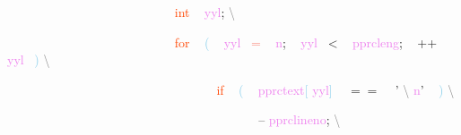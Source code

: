 \documentclass[8, usernames, dvipsnames]{beamer}
\begin{document}
\begin{frame}
\textcolor{White}{\ }
\textcolor{White}{\ }
\textcolor{White}{\ }
\textcolor{White}{\ }
\textcolor{White}{\ }
\textcolor{White}{\ }
\textcolor{White}{\ }
\textcolor{White}{\ }
\textcolor{White}{\ }
\textcolor{White}{\ }
\textcolor{White}{\ }
\textcolor{White}{\ }
\textcolor{White}{\ }
\textcolor{White}{\ }
\textcolor{White}{\ }
\textcolor{White}{\ }
\textcolor{OrangeRed}{int}
\textcolor{White}{\ }
\textcolor{Violet}{yyl}\textcolor{Sepia}{;}
\textcolor{Gray}{\textbackslash }

 \textcolor{White}{\ }
\textcolor{White}{\ }
\textcolor{White}{\ }
\textcolor{White}{\ }
\textcolor{White}{\ }
\textcolor{White}{\ }
\textcolor{White}{\ }
\textcolor{White}{\ }
\textcolor{White}{\ }
\textcolor{White}{\ }
\textcolor{White}{\ }
\textcolor{White}{\ }
\textcolor{White}{\ }
\textcolor{White}{\ }
\textcolor{White}{\ }
\textcolor{White}{\ }
\textcolor{OrangeRed}{for}
\textcolor{White}{\ }
\textcolor{SkyBlue}{(}
\textcolor{White}{\ }
\textcolor{Violet}{yyl}\textcolor{White}{\ }
\textcolor{Salmon}{=}
\textcolor{White}{\ }
\textcolor{Violet}{n}\textcolor{Sepia}{;}
\textcolor{White}{\ }
\textcolor{Violet}{yyl}\textcolor{White}{\ }
\textcolor{OliveGreen}{\textless}
\textcolor{White}{\ }
\textcolor{Violet}{pprcleng}\textcolor{Sepia}{;}
\textcolor{White}{\ }
\textcolor{Apricot}{++}
\textcolor{Violet}{yyl}\textcolor{White}{\ }
\textcolor{SkyBlue}{)}
\textcolor{Gray}{\textbackslash }

 \textcolor{White}{\ }
\textcolor{White}{\ }
\textcolor{White}{\ }
\textcolor{White}{\ }
\textcolor{White}{\ }
\textcolor{White}{\ }
\textcolor{White}{\ }
\textcolor{White}{\ }
\textcolor{White}{\ }
\textcolor{White}{\ }
\textcolor{White}{\ }
\textcolor{White}{\ }
\textcolor{White}{\ }
\textcolor{White}{\ }
\textcolor{White}{\ }
\textcolor{White}{\ }
\textcolor{White}{\ }
\textcolor{White}{\ }
\textcolor{White}{\ }
\textcolor{White}{\ }
\textcolor{OrangeRed}{if}
\textcolor{White}{\ }
\textcolor{SkyBlue}{(}
\textcolor{White}{\ }
\textcolor{Violet}{pprctext}\textcolor{SkyBlue}{[}
\textcolor{Violet}{yyl}\textcolor{SkyBlue}{]}
\textcolor{White}{\ }
\textcolor{OliveGreen}{$==$}
\textcolor{White}{\ }
\textcolor{BurntOrange}{'}
\textcolor{Gray}{\textbackslash }
\textcolor{Violet}{n}\textcolor{BurntOrange}{'}
\textcolor{White}{\ }
\textcolor{SkyBlue}{)}
\textcolor{Gray}{\textbackslash }

 \textcolor{White}{\ }
\textcolor{White}{\ }
\textcolor{White}{\ }
\textcolor{White}{\ }
\textcolor{White}{\ }
\textcolor{White}{\ }
\textcolor{White}{\ }
\textcolor{White}{\ }
\textcolor{White}{\ }
\textcolor{White}{\ }
\textcolor{White}{\ }
\textcolor{White}{\ }
\textcolor{White}{\ }
\textcolor{White}{\ }
\textcolor{White}{\ }
\textcolor{White}{\ }
\textcolor{White}{\ }
\textcolor{White}{\ }
\textcolor{White}{\ }
\textcolor{White}{\ }
\textcolor{White}{\ }
\textcolor{White}{\ }
\textcolor{White}{\ }
\textcolor{White}{\ }
\textcolor{Apricot}{--}
\textcolor{Violet}{pprclineno}\textcolor{Sepia}{;}
\textcolor{Gray}{\textbackslash }


\end{frame}
\end{document}
